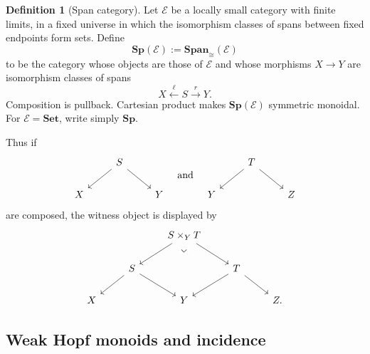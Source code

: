 \documentclass[oneside]{article}
\newcommand{\Sp}{\mathbf{Sp}}
\newcommand{\Span}{\mathbf{Span}}
\theoremstyle{plain}
\theoremstyle{definition}
\newtheorem{definition}[theorem]{Definition}
\theoremstyle{remark}
\begin{document}
\begin{definition}[Span category]
\label{def:cgqg-span-category}
    Let \(\mathcal E\) be a locally small category with finite limits, in a fixed universe in which the isomorphism classes of spans between fixed endpoints form sets. Define
    \[
        \Sp(\mathcal E):=\Span_{\cong}(\mathcal E)
    \]
    to be the category whose objects are those of \(\mathcal E\) and whose morphisms \(X\to Y\) are isomorphism classes of spans
    \[
        X\xleftarrow{\ell}S\xrightarrow{r}Y.
    \]
    Composition is pullback. Cartesian product makes \(\Sp(\mathcal E)\) symmetric monoidal. For \(\mathcal E=\mathbf{Set}\), write simply \(\Sp\).

    Thus if
    \begin{equation*}
       \begin{tikzcd}
            & S \ar[dr] \ar[dl]& \\
            X & & Y
        \end{tikzcd}
        \quad 
        \text{and}
        \quad
        \begin{tikzcd}
            & T \ar[dr] \ar[dl] & \\
            Y & & Z
        \end{tikzcd} 
    \end{equation*}    
    are composed, the witness object is displayed by
    \begin{equation*}
        \begin{tikzcd}
            && S\times_YT
                \ar[dr]
                \ar[dl]
                \ar[dd, phantom, "\rotatebox{-45}{$\lrcorner$}" description, very near start]
            && \\
            & S \ar[dr] \ar[dl] && T \ar[dr] \ar[dl] & \\
            X && Y && Z.
        \end{tikzcd}
    \end{equation*}
\end{definition}

\subsection{Weak Hopf monoids and incidence}
\end{document}
